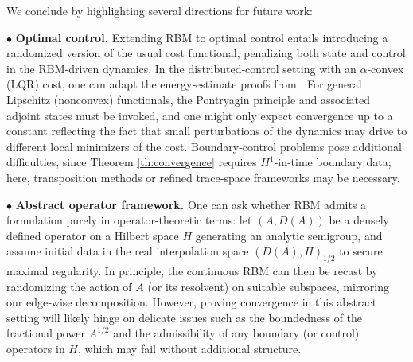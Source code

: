 \documentclass[a4paper, 10pt, english]{article}
\begin{document}
We conclude by highlighting several directions for future work:
\smallbreak

\noindent
$\bullet$  \textbf{Optimal control.} Extending RBM to optimal control entails introducing a randomized version of the usual cost functional, penalizing both state and control in the RBM‐driven dynamics. In the distributed‐control setting with an $\alpha$‐convex (LQR) cost, one can adapt the energy‐estimate proofs from \cite{MR4433122}. For general Lipschitz (nonconvex) functionals, the Pontryagin principle and associated adjoint states must be invoked, and one might only expect convergence up to a constant reflecting the fact that small perturbations of the dynamics may drive to different local minimizers of the cost. Boundary‐control problems pose additional difficulties, since Theorem \ref{th:convergence} requires $H^1$‐in‐time boundary data; here, transposition methods or refined trace‐space frameworks may be necessary.




\noindent
$\bullet$ \textbf{Abstract operator framework.} One can ask whether RBM admits a formulation purely in operator‐theoretic terms: let $(A,D(A))$ be a densely defined operator on a Hilbert space $H$ generating an analytic semigroup, and assume initial data in the real interpolation space $(D(A),H)_{1/2}$ to secure maximal regularity.  In principle, the continuous RBM can then be recast by randomizing the action of $A$ (or its resolvent) on suitable subspaces, mirroring our edge‐wise decomposition.  However, proving convergence in this abstract setting will likely hinge on delicate issues such as the boundedness of the fractional power $A^{1/2}$ and the admissibility of any boundary (or control) operators in $H$, which may fail without additional structure.
\end{document}
